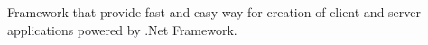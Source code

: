 Framework that provide fast and easy way for creation of client and server applications powered by .Net Framework. 